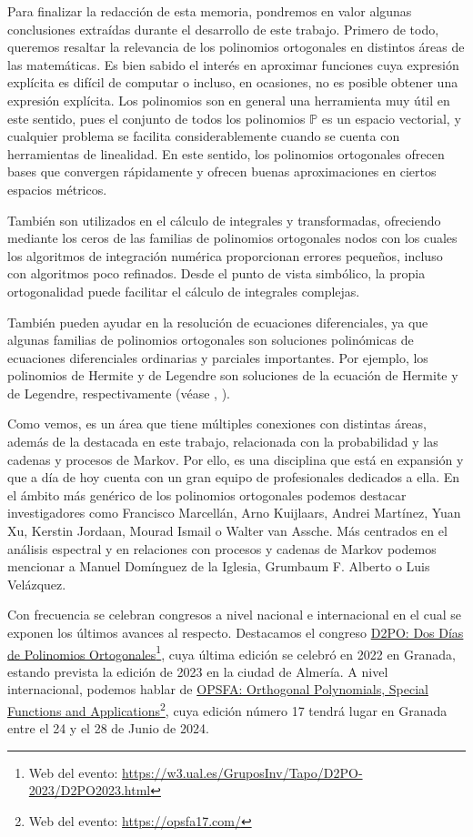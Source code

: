 %
%

Para finalizar la redacción de esta memoria, pondremos en valor algunas conclusiones extraídas durante el desarrollo de este trabajo. Primero de todo, queremos resaltar la relevancia de los polinomios ortogonales en distintos áreas de las matemáticas. Es bien sabido el interés en aproximar funciones cuya expresión explícita es difícil de computar o incluso, en ocasiones, no es posible obtener una expresión explícita. Los polinomios son en general una herramienta muy útil en este sentido, pues el conjunto de todos los polinomios $\mathbb P$ es un espacio vectorial, y cualquier problema se facilita considerablemente cuando se cuenta con herramientas de linealidad. En este sentido, los polinomios ortogonales ofrecen bases que convergen rápidamente y ofrecen buenas aproximaciones en ciertos espacios métricos.

También son utilizados en el cálculo de integrales y transformadas, ofreciendo mediante los ceros de las familias de polinomios ortogonales nodos con los cuales los algoritmos de integración numérica proporcionan errores pequeños, incluso con algoritmos poco refinados. Desde el punto de vista simbólico, la propia ortogonalidad puede facilitar el cálculo de integrales complejas.

También pueden ayudar en la resolución de ecuaciones diferenciales, ya que algunas familias de polinomios ortogonales son soluciones polinómicas de ecuaciones diferenciales ordinarias y parciales importantes. Por ejemplo, los polinomios de Hermite y de Legendre son soluciones de la ecuación de Hermite y de Legendre, respectivamente (véase \cite{Hermite-ed}, \cite{Legendre-ed}).

Como vemos, es un área que tiene múltiples conexiones con distintas áreas, además de la destacada en este trabajo, relacionada con la probabilidad y las cadenas y procesos de Markov. Por ello, es una disciplina que está en expansión y que a día de hoy cuenta con un gran equipo de profesionales dedicados a ella. En el ámbito más genérico de los polinomios ortogonales podemos destacar investigadores como Francisco Marcellán, Arno Kuijlaars, Andrei Martínez, Yuan Xu, Kerstin Jordaan, Mourad Ismail o Walter van Assche. Más centrados en el análisis espectral y en relaciones con procesos y cadenas de Markov podemos mencionar a Manuel Domínguez de la Iglesia, Grumbaum F. Alberto o Luis Velázquez.

Con frecuencia se celebran congresos a nivel nacional e internacional en el cual se exponen los últimos avances al respecto. Destacamos el congreso \href{https://w3.ual.es/GruposInv/Tapo/D2PO-2023/D2PO2023.html}{D2PO: Dos Días de Polinomios Ortogonales}\footnote{Web del evento: \url{https://w3.ual.es/GruposInv/Tapo/D2PO-2023/D2PO2023.html}}, cuya última edición se celebró en 2022 en Granada, estando prevista la edición de 2023 en la ciudad de Almería. A nivel internacional, podemos hablar de \href{https://opsfa17.com/}{OPSFA: Orthogonal Polynomials, Special Functions and Applications}\footnote{Web del evento: \url{https://opsfa17.com/}}, cuya edición número 17 tendrá lugar en Granada entre el 24 y el 28 de Junio de 2024.

